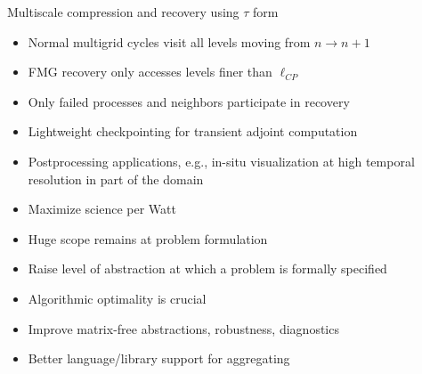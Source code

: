 \documentclass{beamer}
\newcommand{\mglevel}{\ensuremath{\ell}}
\newcommand{\mglevelcp}{\ensuremath{\mglevel_{\mathrm{cp}}}}
\begin{document}
\begin{frame}[fragile]{Multiscale compression and recovery using $\tau$ form}
  \begin{itemize}
  \item Normal multigrid cycles visit all levels moving from $n \to n+1$
  \item FMG recovery only accesses levels finer than $\ell_{CP}$
  \item Only failed processes and neighbors participate in recovery
  \item Lightweight checkpointing for transient adjoint computation
  \item Postprocessing applications, e.g., in-situ visualization at high temporal resolution in part of the domain
  \end{itemize}
\end{frame}

\begin{frame}\LARGE
  \begin{itemize}
  \item Maximize science per Watt
  \item Huge scope remains at problem formulation
  \item Raise level of abstraction at which a problem is formally specified
  \item Algorithmic optimality is crucial
  \item Improve matrix-free abstractions, robustness, diagnostics
  \item Better language/library support for aggregating
  \end{itemize}
\end{frame}
\end{document}
